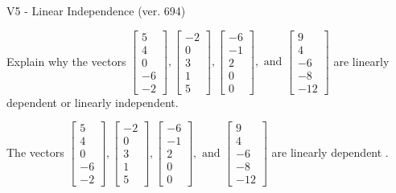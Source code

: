 \begin{exercise}
  \begin{exerciseTitle}V5 - Linear Independence (ver. 694)\end{exerciseTitle}
  \begin{exerciseStatement}
    Explain why the vectors \(\left[\begin{array}{r}
5 \\
4 \\
0 \\
-6 \\
-2
\end{array}\right] , \left[\begin{array}{r}
-2 \\
0 \\
3 \\
1 \\
5
\end{array}\right] , \left[\begin{array}{r}
-6 \\
-1 \\
2 \\
0 \\
0
\end{array}\right] , \text{ and } \left[\begin{array}{r}
9 \\
4 \\
-6 \\
-8 \\
-12
\end{array}\right]\) are linearly dependent or linearly independent.	


  \end{exerciseStatement}
  \begin{exerciseAnswer}
   The vectors \(\left[\begin{array}{r}
5 \\
4 \\
0 \\
-6 \\
-2
\end{array}\right] , \left[\begin{array}{r}
-2 \\
0 \\
3 \\
1 \\
5
\end{array}\right] , \left[\begin{array}{r}
-6 \\
-1 \\
2 \\
0 \\
0
\end{array}\right] , \text{ and } \left[\begin{array}{r}
9 \\
4 \\
-6 \\
-8 \\
-12
\end{array}\right]\) are 
  	 linearly dependent  .
  


  \end{exerciseAnswer}
\end{exercise}